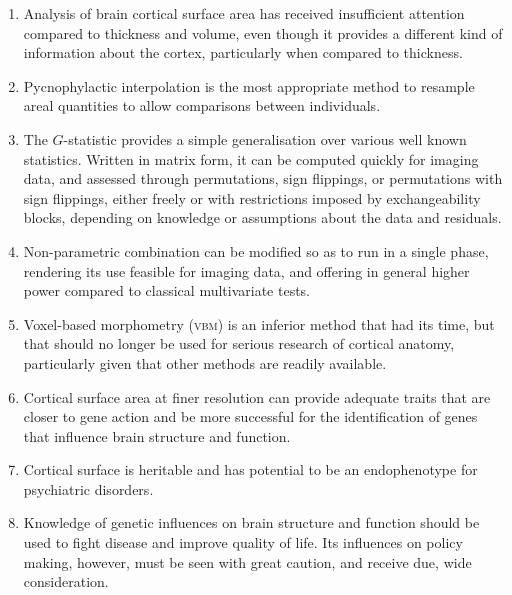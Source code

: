 \begin{enumerate}[leftmargin=*]
\item Analysis of brain cortical surface area has received insufficient attention compared to thickness and volume, even though it provides a different kind of information about the cortex, particularly when compared to thickness.
\item Pycnophylactic interpolation is the most appropriate method to resample areal quantities to allow comparisons between individuals.
\item The $G$-statistic provides a simple generalisation over various well known statistics. Written in matrix form, it can be computed quickly for imaging data, and assessed through permutations, sign flippings, or permutations with sign flippings, either freely or with restrictions imposed by exchangeability blocks,  depending on knowledge or assumptions about the data and residuals.
\item Non-parametric combination can be modified so as to run in a single phase, rendering its use feasible for imaging data, and offering in general higher power compared to classical multivariate tests.
\item Voxel-based morphometry (\textsc{vbm}) is an inferior method that had its time, but that should no longer be used for serious research of cortical anatomy, particularly given that other methods are readily available.
\item Cortical surface area at finer resolution can provide adequate traits that are closer to gene action and be more successful for the identification of genes that influence brain structure and function.
\item Cortical surface is heritable and has potential to be an endophenotype for psychiatric disorders.
\item Knowledge of genetic influences on brain structure and function should be used to fight disease and improve quality of life. Its influences on policy making, however, must be seen with great caution, and receive due, wide consideration.
\end{enumerate}
\vspace*{\fill}